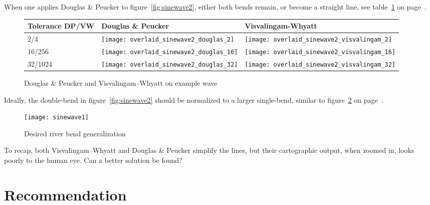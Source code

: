 \documentclass[a4paper]{article}
\newcommand{\DP}{Douglas \& Peucker}
\newcommand{\VW}{Visvalingam--Whyatt}
\begin{document}
When one applies {\DP} to figure~\ref{fig:sinewave2}, either both bends remain,
or become a straight line, see table~\ref{tab:comparison-sinewave2} on
page~\pageref{tab:comparison-sinewave2}.

\begin{figure}[h]
    \renewcommand{\tabularxcolumn}[1]{>{\center\small}m{#1}}
    \begin{tabularx}{\textwidth}{ p{1.5cm} | X | X | }
        Tolerance DP/VW                                                       &
        Douglas \& Peucker                                                    &
        Visvalingam-Whyatt                                                    \tabularnewline \hline

        2/4                                                                   &
        \texttt{[image: overlaid\_sinewave2\_douglas\_2]}      &
        \texttt{[image: overlaid\_sinewave2\_visvalingam\_2]}  \tabularnewline \hline

        16/256                                                                &
        \texttt{[image: overlaid\_sinewave2\_douglas\_16]}     &
        \texttt{[image: overlaid\_sinewave2\_visvalingam\_16]} \tabularnewline \hline

        32/1024                                                               &
        \texttt{[image: overlaid\_sinewave2\_douglas\_32]}     &
        \texttt{[image: overlaid\_sinewave2\_visvalingam\_32]} \tabularnewline \hline

    \end{tabularx}
    \caption{{\DP} and {\VW} on example wave}
    \label{tab:comparison-sinewave2}
\end{figure}

Ideally, the double-bend in figure~\ref{fig:sinewave2} should be normalized to
a larger single-bend, similar to figure~\ref{fig:sinewave1} on
page~\pageref{fig:sinewave2}.

\begin{figure}[h]
    \centering
    \texttt{[image: sinewave1]}
    \caption{Desired river bend generalization}
    \label{fig:sinewave1}
\end{figure}

To recap, both {\VW} and {\DP} simplify the lines, but their cartographic
output, when zoomed in, looks poorly to the human eye. Can a better solution be
found?

\section{Recommendation}
\label{sec:recommendation}
\end{document}
